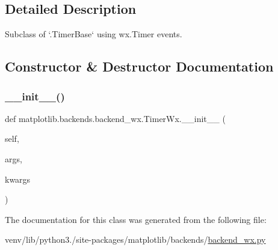 \subsection{Detailed Description}
\begin{DoxyVerb}Subclass of `.TimerBase` using wx.Timer events.\end{DoxyVerb}
 

\subsection{Constructor \& Destructor Documentation}
\mbox{\label{classmatplotlib_1_1backends_1_1backend__wx_1_1TimerWx_a6a48183766604d46f1e7fd7a4c432924}} 
\subsubsection{\texorpdfstring{\+\_\+\+\_\+init\+\_\+\+\_\+()}{\_\_init\_\_()}}
{\footnotesize\ttfamily def matplotlib.\+backends.\+backend\+\_\+wx.\+Timer\+Wx.\+\_\+\+\_\+init\+\_\+\+\_\+ (\begin{DoxyParamCaption}\item[{}]{self,  }\item[{}]{args,  }\item[{}]{kwargs }\end{DoxyParamCaption})}



The documentation for this class was generated from the following file\+:\begin{DoxyCompactItemize}
\item 
venv/lib/python3./site-\/packages/matplotlib/backends/\hyperlink{backend__wx_8py}{backend\+\_\+wx.\+py}\end{DoxyCompactItemize}
